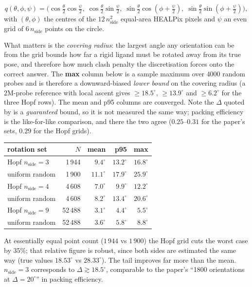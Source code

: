 \documentclass[11pt,a4paper]{article}
\begin{document}
\begin{equation}
  q(\theta,\phi,\psi) =
  \bigl(\cos\tfrac{\theta}{2}\cos\tfrac{\psi}{2},\;
        \cos\tfrac{\theta}{2}\sin\tfrac{\psi}{2},\;
        \sin\tfrac{\theta}{2}\cos(\phi+\tfrac{\psi}{2}),\;
        \sin\tfrac{\theta}{2}\sin(\phi+\tfrac{\psi}{2})\bigr),
\end{equation}
with $(\theta,\phi)$ the centres of the $12\,n_{\text{side}}^2$ equal-area
HEALPix pixels and $\psi$ an even grid of $6\,n_{\text{side}}$ points on the
circle.

What matters is the \emph{covering radius}: the largest angle any orientation
can be from the grid bounds how far a rigid ligand must be rotated away from its
true pose, and therefore how much clash penalty the discretisation forces onto
the correct answer. The \textbf{max} column below is a sample maximum over
$4000$ random probes and is therefore a downward-biased \emph{lower bound} on
the covering radius (a $2$M-probe reference with local ascent gives
$\ge 18.5^\circ$, $\ge 13.9^\circ$ and $\ge 6.2^\circ$ for the three Hopf
rows). The mean and p95 columns are converged. Note the $\Delta$ quoted by
\cite{ChenWeng2003psc} is a \emph{guaranteed} bound, so it is not measured the
same way; packing efficiency is the like-for-like comparison, and there the two
agree ($0.25$--$0.31$ for the paper's sets, $0.29$ for the Hopf grids).

\begin{center}
\begin{tabular}{lrrrr}
  \toprule
  rotation set & $N$ & mean & p95 & max \\
  \midrule
  Hopf $n_{\text{side}}=3$ & 1\,944  & $9.4^\circ$ & $13.2^\circ$ & $\mathbf{16.8^\circ}$ \\
  uniform random           & 1\,900  & $11.1^\circ$ & $17.9^\circ$ & $25.9^\circ$ \\
  Hopf $n_{\text{side}}=4$ & 4\,608  & $7.0^\circ$ & $9.9^\circ$ & $\mathbf{12.2^\circ}$ \\
  uniform random           & 4\,608  & $8.2^\circ$ & $13.4^\circ$ & $20.6^\circ$ \\
  Hopf $n_{\text{side}}=9$ & 52\,488 & $3.1^\circ$ & $4.4^\circ$ & $\mathbf{5.5^\circ}$ \\
  uniform random           & 52\,488 & $3.6^\circ$ & $5.8^\circ$ & $8.8^\circ$ \\
  \bottomrule
\end{tabular}
\end{center}

At essentially equal point count ($1\,944$ vs $1\,900$) the Hopf grid cuts the
worst case by 35\%; that relative figure is robust, since both sides are
estimated the same way (true values $18.53^\circ$ vs $28.33^\circ$). The tail
improves far more than the mean. $n_{\text{side}}=3$ corresponds to
$\Delta \gtrsim 18.5^\circ$, comparable to the paper's ``1800 orientations at
$\Delta = 20^\circ$'' in packing efficiency.
\end{document}
